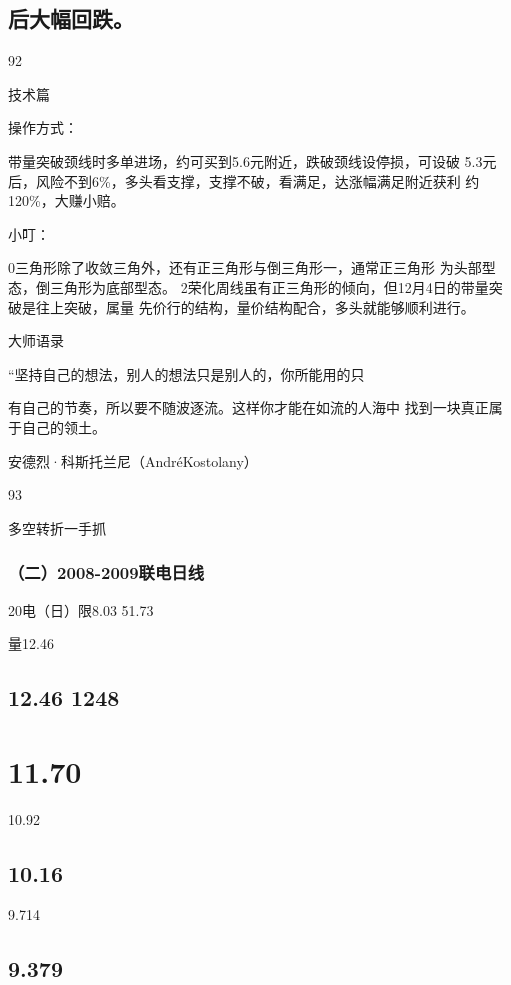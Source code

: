 \documentclass{article}
\begin{document}
\subsection{后大幅回跌。}

92

\clearpage

技术篇

操作方式：

带量突破颈线时多单进场，约可买到5.6元附近，跌破颈线设停损，可设破 5.3元后，风险不到6\%，多头看支撑，支撑不破，看满足，达涨幅满足附近获利 约120\%，大赚小赔。

小叮：

0三角形除了收敛三角外，还有正三角形与倒三角形一，通常正三角形 为头部型态，倒三角形为底部型态。 2荣化周线虽有正三角形的倾向，但12月4日的带量突破是往上突破，属量 先价行的结构，量价结构配合，多头就能够顺利进行。

大师语录

“坚持自己的想法，别人的想法只是别人的，你所能用的只

有自己的节奏，所以要不随波逐流。这样你才能在如流的人海中 找到一块真正属于自己的领土。

安德烈·科斯托兰尼（AndréKostolany）

93

\clearpage

多空转折一手抓

\subsubsection{（二）2008-2009联电日线}

20电（日）限8.03 51.73

量12.46

\subsection{12.46 1248}

\section{11.70}

10.92

\subsection{10.16}

9.714

\subsection{9.379}
\end{document}

